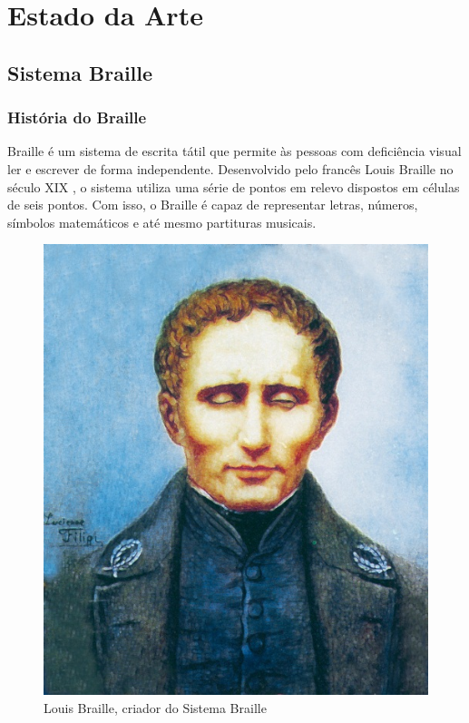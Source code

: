 \chapter{Estado da Arte} 
\label{chap:Chapter02} 

\section{Sistema Braille}

\subsection{História do Braille}

Braille é um sistema de escrita tátil que permite às pessoas com deficiência visual ler e escrever de forma independente. Desenvolvido pelo francês Louis Braille no século XIX \parencite{REF02}, o sistema utiliza uma série de pontos em relevo dispostos em células de seis pontos. Com isso, o Braille é capaz de representar letras, números, símbolos matemáticos e até mesmo partituras musicais. 

\begin{figure}[h]
    \centering
    \includegraphics[scale=0.5]{ch02/assets/louis-braille.jpg}
    \decoRule
    \caption[Louis Braille]{Louis Braille, criador do Sistema Braille \parencite{IMG01}}
    \label{fig:ch02-braille-history-louis-braille}
\end{figure}

